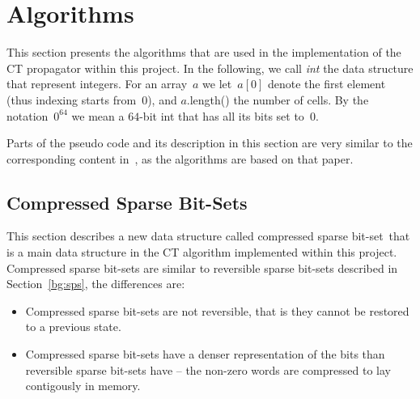 \documentclass[a4paper,11pt]{article}
\newcommand{\Secref}[1]{Section~\ref{#1}}
\newcommand{\BitSet}[0]{Compressed Sparse Bit-Set}
\newcommand{\bitset}[0]{compressed sparse bit-set}
\newcommand{\Bitset}[0]{Compressed sparse bit-set}
\newcommand{\CTpaper}[0]{DBLP:conf/cp/DemeulenaereHLP16}
\numberwithin{equation}{section}
\begin{document}

\section{Algorithms}
\label{sec:algorithms}


This section presents the algorithms that are used in the implementation of the
CT propagator within this project.
In the following, we call \emph{int} the data structure that represent
integers. For an array~$a$ we let~$a[0]$ denote the first element
(thus indexing starts from~$0$), and
$a$.length() the number of cells.
By the notation~$0^{64}$ we mean a $64$-bit int that has all its
bits set to~$0$.

Parts of the pseudo code and its description in this section are very
similar to the corresponding content in~\cite{\CTpaper}, as the algorithms
are based on that paper.


\subsection{{\BitSet}s}
\label{sec:sbs}
This section describes a new data structure called 
\bitset~that is a main data structure
in the CT algorithm implemented within this project. {\Bitset}s are similar to
reversible sparse bit-sets described in \Secref{bg:sps},
the differences are:
\begin{itemize}
  \item {\Bitset}s are not reversible, that is they cannot be restored to a previous
    state.
  \item {\Bitset}s have a denser representation of the bits than reversible sparse
    bit-sets have -- the non-zero words are compressed to lay contigously in memory.
\end{itemize}
\end{document}
